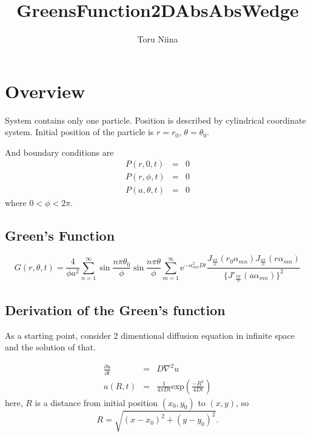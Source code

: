 \documentclass{article}
\begin{document}
\title{GreensFunction2DAbsAbsWedge}
\author{Toru Niina}
\maketitle

\section{Overview}

System contains only one particle. 
 Position is described by cylindrical coordinate system.
 Initial position of the particle is $r = r_0$, $\theta = \theta_0$.

And boundary conditions are
\begin{eqnarray}
    P(r, 0, t)      &=& 0 \nonumber \\
    P(r, \phi, t)   &=& 0 \nonumber \\ 
    P(a, \theta, t) &=& 0
    \label{boundary-condition}
\end{eqnarray}
where $0 < \phi < 2\pi$.

\subsection{Green's Function}
\begin{equation}\label{greens-function}
    G(r, \theta, t) =
          \frac{4}{\phi a^2}\sum^{\infty}_{n=1}
          \sin\frac{n\pi\theta_0}{\phi}\sin\frac{n\pi\theta}{\phi}
          \sum^{\infty}_{m=1}\mathrm{e}^{-\alpha_{mn}^2Dt}
          \frac{J_{\frac{n\pi}{\phi}}(r_0\alpha_{mn})
                J_{\frac{n\pi}{\phi}}(r\alpha_{mn})}
          {\{J'_{\frac{n\pi}{\phi}}(a\alpha_{mn})\}^2}
%
\end{equation}

\subsection{Derivation of the Green's function}
As a starting point, consider 2 dimentional diffusion equation in infinite space
and the solution of that.

\begin{eqnarray}
    \frac{\partial u}{\partial t} &=& D\nabla^2 u \\
    u(R, t) &=& \frac{1}{4\pi Dt}\mathrm{exp}\left(\frac{-R^2}{4Dt}\right)
    \label{solution-infinite}
\end{eqnarray}
here, $R$ is a distance from initial position $(x_0, y_0)$ to $(x, y)$, so
\begin{equation}
 R = \sqrt{(x-x_0)^2+(y-y_0)^2}.
\end{equation}
\end{document}
